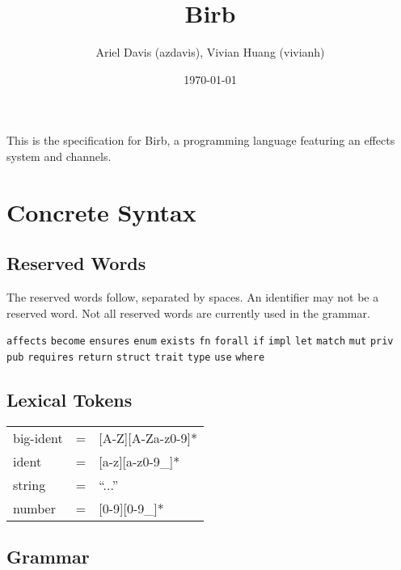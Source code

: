 \documentclass[12pt]{article}
\title{Birb}
\author{Ariel Davis (azdavis), Vivian Huang (vivianh)}
\date{\today}
\newcommand{\T}[1]{\texttt{#1}}
\newcommand{\N}[1]{\textlangle#1\textrangle}
\begin{document}
\maketitle

This is the specification for Birb, a programming language featuring an effects
system and channels.

\newpage
\section{Concrete Syntax}

\subsection{Reserved Words}

The reserved words follow, separated by spaces. An identifier may not be a
reserved word. Not all reserved words are currently used in the grammar.

\T{affects}
\T{become}
\T{ensures}
\T{enum}
\T{exists}
\T{fn}
\T{forall}
\T{if}
\T{impl}
\T{let}
\T{match}
\T{mut}
\T{priv}
\T{pub}
\T{requires}
\T{return}
\T{struct}
\T{trait}
\T{type}
\T{use}
\T{where}

\subsection{Lexical Tokens}

\begin{tabular}{lll}
\N{big-ident} & =
  & [A-Z][A-Za-z0-9]* \\
\N{ident} & =
  & [a-z][a-z0-9\_]* \\
\N{string} & =
  & ``...'' \\
\N{number} & =
  & [0-9][0-9\_]*
\end{tabular}

\subsection{Grammar}
\end{document}
